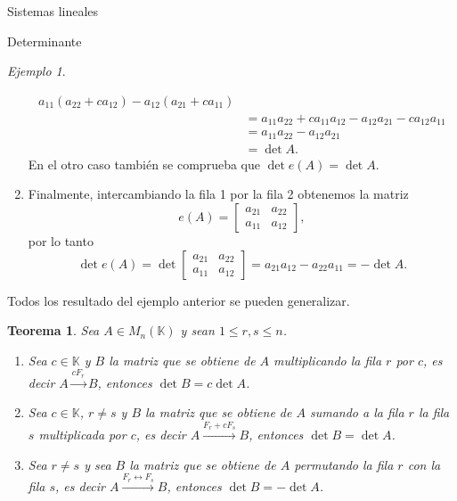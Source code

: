 \documentclass[a4paper,12pt,twoside,spanish,reqno]{amsbook}
\numberwithin{equation}{section}
\newtheorem{teorema}{Teorema}[section]
\theoremstyle{definition}
\theoremstyle{remark}
\newtheorem*{ejemplo*}{Ejemplo}
\newcommand{\K}{\mathbb K}
\begin{document}
\begin{chapter}{Sistemas lineales}
\begin{section}{Determinante}
\begin{ejemplo*}
\begin{enumerate}
\begin{align*}
                a_{11}(a_{22}+ ca_{12})- a_{12}( a_{21}+ ca_{11}) \\
                &= a_{11}a_{22}+ ca_{11}a_{12}- a_{12} a_{21}- ca_{12} a_{11}\\
                &= a_{11}a_{22}- a_{12} a_{21} \\
                &= \det A.
            \end{align*}
            En  el otro caso también se comprueba que $\det e(A) = \det A$. 
            \item Finalmente, intercambiando la fila 1 por la fila 2 obtenemos la matriz
            \begin{equation*}
            e(A)=\begin{bmatrix} a_{21}& a_{22}\\ a_{11}&a_{12}\end{bmatrix},
            \end{equation*}
            por lo tanto 
            \begin{equation*}
            \det e(A)= \det \begin{bmatrix} a_{21}& a_{22}\\ a_{11}&a_{12}\end{bmatrix} = a_{21}a_{12} - a_{22}a_{11} = -\det A.
            \end{equation*}
        \end{enumerate}
    \end{ejemplo*}
    
    Todos los resultado del ejemplo anterior se pueden generalizar. 
    
    \begin{teorema} \label{det-prop-fundamentales}
        Sea $A  \in M_n(\K)$ y sean $1 \le r,s \le n$.
        \begin{enumerate}
            \item Sea $c \in \K$ y $B$ la matriz que se obtiene de $A$ multiplicando la fila $r$ por $c$, es decir $A  \stackrel{cF_r}{\longrightarrow} B$, entonces $\det B = c \det A$.
            \item  Sea $c \in \K$, $r \ne s$ y $B$ la matriz que se obtiene de $A$ sumando a la fila $r$ la fila $s$ multiplicada por $c$, es decir  $A  \stackrel{F_r + cF_s}{\longrightarrow} B$, entonces $\det B = \det A$.
            \item Sea $r \ne s$ y sea $B$ la matriz que se obtiene de $A$ permutando la fila $r$ con la fila $s$, es decir  $A  \stackrel{F_r \leftrightarrow F_s}{\longrightarrow}B$, entonces $\det B = -\det A$.
            

\end{enumerate}
\end{teorema}
\end{section}
\end{chapter}
\end{document}
